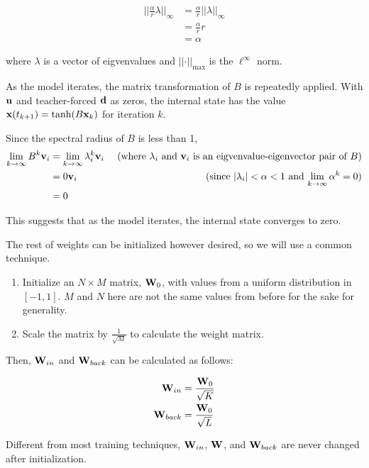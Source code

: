 \documentclass{article}
\begin{document}
\begin{align*}
    \vert\vert \frac{\alpha}{r} \lambda \vert\vert_\infty
    &= \frac{\alpha}{r} \vert\vert \lambda \vert\vert_\infty \\
    &= \frac{\alpha}{r} r \\
    &= \alpha
\end{align*}

where $\lambda$ is a vector of eigvenvalues and $\vert \vert \cdot \vert
\vert_\text{max}$ is the $\ell^\infty$ norm.

As the model iterates, the matrix transformation of $B$ is repeatedly
applied. With $\mathbf{u}$ and teacher-forced $\mathbf{d}$ as zeros, the internal state has
the value $\mathbf{x}(t_{k+1}) = \tanh(B \mathbf{x}_k)$ for iteration $k$.

Since the spectral radius of $B$ is less than 1,
\begin{align*}
    \lim_{k \to \infty}B^k \mathbf{v}_i &= \lim_{k \to \infty} \lambda_i^k \mathbf{v}_i & \text{ (where $\lambda_i$ and $\mathbf{v}_i$ is an eigvenvalue-eigenvector pair of $B$)} \\
    &= 0 \mathbf{v}_i & \text{ (since $\vert\lambda_i\vert < \alpha < 1$ and $\lim_{k \to \infty}\alpha^k = 0$)} \\
    &= 0
\end{align*}

This suggests that as the model iterates, the internal state converges to
zero.

The rest of weights can be initialized however desired, so we will use a
common technique.

\begin{enumerate}
    \item Initialize an $N \times M$ matrix, $\mathbf{W}_0$, with values from a 
    uniform distribution in $[-1, 1]$. $M$ and $N$ here are not the 
    same values from before for the sake for generality. 
    \item Scale the matrix by $\frac{1}{\sqrt{M}}$ to calculate the weight matrix.
\end{enumerate}

Then, $\mathbf{W}_{in}$ and $\mathbf{W}_{back}$ can be calculated as follows:

\begin{align}
    \mathbf{W}_{in} &= \frac{\mathbf{W}_0}{\sqrt{K}} \nonumber \\
    \mathbf{W}_{back} &= \frac{\mathbf{W}_0}{\sqrt{L}} \nonumber
\end{align}

Different from most training techniques, $\mathbf{W}_{in}$, $\mathbf{W}$, and $\mathbf{W}_{back}$ are never
changed after initialization.
\end{document}
